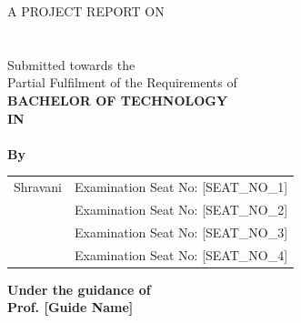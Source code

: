 \documentclass[12pt,a4]{report}
\begin{document}
\pagestyle{empty}

\vspace*{\fill}
\begin{center}

{\large  A  PROJECT REPORT ON}\\
\vspace{0.5cm}
\vspace{0.5cm}
{\bfseries \fontsize{16}{12} \selectfont{SYNAPSE}  \\ \vspace*{1\baselineskip}}
{\bfseries \fontsize{14}{12} \selectfont{AI-Powered AIOps Platform for Automated Root Cause Analysis of Microservice Failures}  \\ \vspace*{2\baselineskip}}
{\fontsize{12}{12} \selectfont Submitted towards the
 \\Partial Fulfilment of the Requirements of} \\
\vspace{1cm}
{\bfseries \fontsize{14}{12} \selectfont BACHELOR OF TECHNOLOGY \\
\vspace*{0.5\baselineskip}
IN
\vspace*{0.5\baselineskip}
\\[DEPARTMENT NAME]\\
\vspace*{1\baselineskip}}
\fontsize{14}{12} \selectfont \textbf{By} \\
{\large \begin{center}
\begin{tabular}{l l}
Shravani         & Examination Seat No: [SEAT\_NO\_1]  \\
[Teammate 2]     & Examination Seat No: [SEAT\_NO\_2]  \\
[Teammate 3]     & Examination Seat No: [SEAT\_NO\_3]  \\
[Teammate 4]     & Examination Seat No: [SEAT\_NO\_4]  \\
\end{tabular}
\end{center}}
{\bfseries \large Under the guidance of} \\
\vspace{0.5cm}
{\bfseries \large Prof. [Guide Name]} \\ \vspace{0.5cm}


\end{center}
\end{document}
